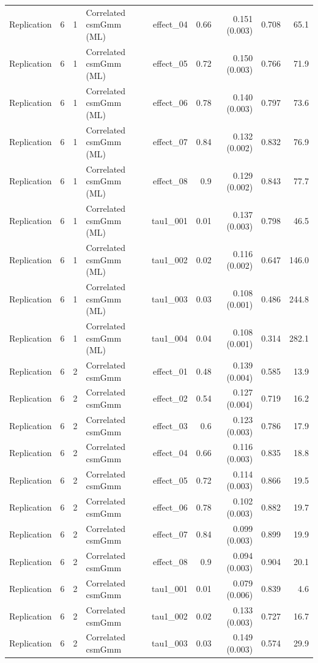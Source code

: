 \begin{longtable}{lcclrrrrr}
Replication & 6 & 1 & Correlated csmGmm (ML) & effect\_04 & 0.66 & 0.151 (0.003) & 0.708 & 65.1\\
Replication & 6 & 1 & Correlated csmGmm (ML) & effect\_05 & 0.72 & 0.150 (0.003) & 0.766 & 71.9\\
Replication & 6 & 1 & Correlated csmGmm (ML) & effect\_06 & 0.78 & 0.140 (0.003) & 0.797 & 73.6\\
Replication & 6 & 1 & Correlated csmGmm (ML) & effect\_07 & 0.84 & 0.132 (0.002) & 0.832 & 76.9\\
Replication & 6 & 1 & Correlated csmGmm (ML) & effect\_08 & 0.9 & 0.129 (0.002) & 0.843 & 77.7\\
Replication & 6 & 1 & Correlated csmGmm (ML) & tau1\_001 & 0.01 & 0.137 (0.003) & 0.798 & 46.5\\
Replication & 6 & 1 & Correlated csmGmm (ML) & tau1\_002 & 0.02 & 0.116 (0.002) & 0.647 & 146.0\\
Replication & 6 & 1 & Correlated csmGmm (ML) & tau1\_003 & 0.03 & 0.108 (0.001) & 0.486 & 244.8\\
Replication & 6 & 1 & Correlated csmGmm (ML) & tau1\_004 & 0.04 & 0.108 (0.001) & 0.314 & 282.1\\
Replication & 6 & 2 & Correlated csmGmm & effect\_01 & 0.48 & 0.139 (0.004) & 0.585 & 13.9\\
Replication & 6 & 2 & Correlated csmGmm & effect\_02 & 0.54 & 0.127 (0.004) & 0.719 & 16.2\\
Replication & 6 & 2 & Correlated csmGmm & effect\_03 & 0.6 & 0.123 (0.003) & 0.786 & 17.9\\
Replication & 6 & 2 & Correlated csmGmm & effect\_04 & 0.66 & 0.116 (0.003) & 0.835 & 18.8\\
Replication & 6 & 2 & Correlated csmGmm & effect\_05 & 0.72 & 0.114 (0.003) & 0.866 & 19.5\\
Replication & 6 & 2 & Correlated csmGmm & effect\_06 & 0.78 & 0.102 (0.003) & 0.882 & 19.7\\
Replication & 6 & 2 & Correlated csmGmm & effect\_07 & 0.84 & 0.099 (0.003) & 0.899 & 19.9\\
Replication & 6 & 2 & Correlated csmGmm & effect\_08 & 0.9 & 0.094 (0.003) & 0.904 & 20.1\\
Replication & 6 & 2 & Correlated csmGmm & tau1\_001 & 0.01 & 0.079 (0.006) & 0.839 & 4.6\\
Replication & 6 & 2 & Correlated csmGmm & tau1\_002 & 0.02 & 0.133 (0.003) & 0.727 & 16.7\\
Replication & 6 & 2 & Correlated csmGmm & tau1\_003 & 0.03 & 0.149 (0.003) & 0.574 & 29.9\\

\end{longtable}
